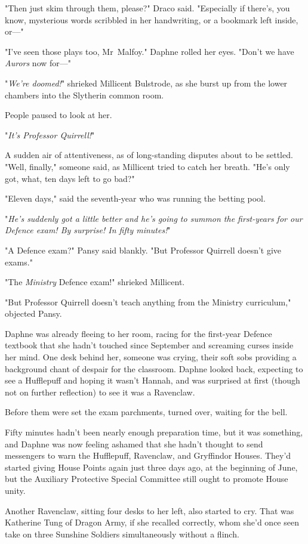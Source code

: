 "Then just skim through them, please?" Draco said. "Especially if there’s, you
know, mysterious words scribbled in her handwriting, or a bookmark left inside,
or—"

"I’ve seen those plays too, Mr~Malfoy." Daphne rolled her eyes. "Don’t we have
\emph{Aurors} now for—"

"\emph{We’re doomed!}" shrieked Millicent Bulstrode, as she burst up from the
lower chambers into the Slytherin common room.

People paused to look at her.

"\emph{It’s Professor Quirrell!}"

A sudden air of attentiveness, as of long-standing disputes about to be
settled. "Well, finally," someone said, as Millicent tried to catch her breath.
"He’s only got, what, ten days left to go bad?"

"Eleven days," said the seventh-year who was running the betting pool.

"\emph{He’s suddenly got a little better and he’s going to summon the
first-years for our Defence exam! By surprise! In fifty minutes!}"

"A Defence exam?" Pansy said blankly. "But Professor Quirrell doesn’t give
exams."

"The \emph{Ministry} Defence exam!" shrieked Millicent.

"But Professor Quirrell doesn’t teach anything from the Ministry curriculum,"
objected Pansy.

Daphne was already fleeing to her room, racing for the first-year Defence
textbook that she hadn’t touched since September and screaming curses inside
her mind.
\later
One desk behind her, someone was crying, their soft sobs providing a
background chant of despair for the classroom. Daphne looked back, expecting to
see a Hufflepuff and hoping it wasn’t Hannah, and was surprised at first
(though not on further reflection) to see it was a Ravenclaw.

Before them were set the exam parchments, turned over, waiting for the bell.

Fifty minutes hadn’t been nearly enough preparation time, but it was something,
and Daphne was now feeling ashamed that she hadn’t thought to send messengers
to warn the Hufflepuff, Ravenclaw, and Gryffindor Houses. They’d started giving
House Points again just three days ago, at the beginning of June, but the
Auxiliary Protective Special Committee still ought to promote House unity.

Another Ravenclaw, sitting four desks to her left, also started to cry. That
was Katherine Tung of Dragon Army, if she recalled correctly, whom she’d once
seen take on three Sunshine Soldiers simultaneously without a flinch.

